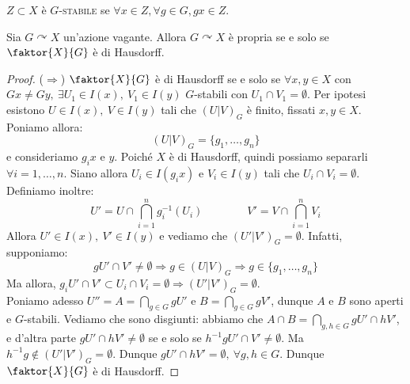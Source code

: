 \begin{defn}
$Z \subset X$ è \textsc{$G$-stabile} se $\forall x \in Z, \forall g \in G, gx \in Z$.
\end{defn}

\begin{thm}
Sia $G \curvearrowright X$ un'azione vagante. Allora $G \curvearrowright X$ è propria se e solo se $\faktor {X}{G}$ è di Hausdorff.
\end{thm}
\begin{proof}
($\Longrightarrow$) $\faktor{X}{G}$ è di Hausdorff se e solo se $\forall x,y \in X$ con $Gx \neq Gy,\ \exists U_1 \in I(x),\ V_1 \in I(y)$ $G$-stabili con $U_1 \cap V_1 =\emptyset$. Per ipotesi esistono $U \in I(x),\ V \in I(y)$ tali che $(U|V)_G$ è finito, fissati $x,y \in X$. Poniamo allora:
$$(U|V)_G=\{g_1,\dots,g_n\}$$
e consideriamo $g_ix$ e $y$. Poiché $X$ è di Hausdorff, quindi possiamo separarli $\forall i=1,\dots,n$. Siano allora $U_i \in I(g_ix)$ e $V_i \in I(y)$ tali che $U_i \cap V_i = \emptyset$. Definiamo inoltre:
$$U'=U \cap \bigcap _{i=1}^n g_i ^{-1} (U_i) \qquad \qquad V'=V \cap \bigcap _{i=1}^n V_i$$
Allora $U' \in I(x),\ V' \in I(y)$ e vediamo che $(U'|V')_G=\emptyset$. Infatti, supponiamo:
$$gU' \cap V' \neq \emptyset \Longrightarrow g \in (U|V)_G \Longrightarrow g \in \{g_1,\dots,g_n\}$$
Ma allora, $g_iU' \cap V' \subset U_i \cap V_i =\emptyset \Longrightarrow (U'|V')_G=\emptyset$. \\
Poniamo adesso $U''=A=\displaystyle \bigcap _{g \in G}gU'$ e $B=\displaystyle \bigcap _{g \in G}gV'$, dunque $A$ e $B$ sono aperti e $G$-stabili. Vediamo che sono disgiunti: abbiamo che $A \cap B= \displaystyle \bigcap _{g,h \in G} gU' \cap hV'$, e d'altra parte $gU' \cap hV' \neq \emptyset$ se e solo se $h^{-1}gU' \cap V' \neq \emptyset$. Ma $h^{-1}g \notin (U'|V')_G=\emptyset$. Dunque $gU' \cap hV'=\emptyset,\ \forall g,h \in G$. Dunque $\faktor {X}{G}$ è di Hausdorff.
\end{proof}

